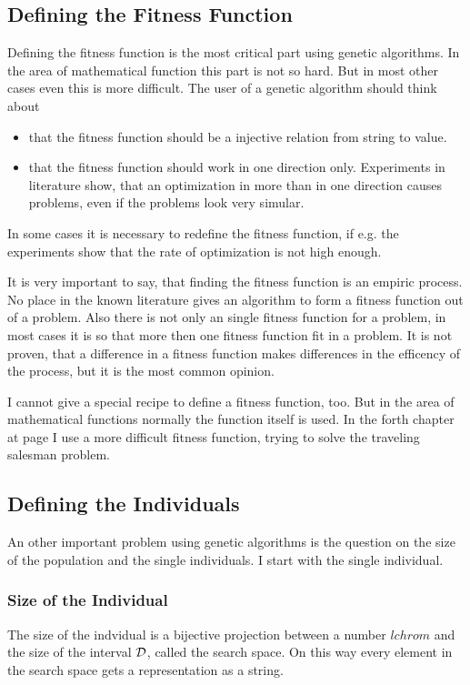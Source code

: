 \subsection{Defining the Fitness Function}
Defining the fitness function is the most critical part using genetic algorithms.
In the area of mathematical function this part is not so hard. But in most other
cases even this is more difficult.
The user of a genetic algorithm should think about
\begin{itemize}
  \item that the fitness function should be a injective relation from string
to value.
  \item that the fitness function should work in one direction only. Experiments
in literature\cite{Gol89} show, that an optimization in more than in one direction
causes problems, even if the problems look very simular.
\end{itemize}
In some cases it is necessary to redefine the fitness function, if e.g. the
experiments show that the rate of optimization is not high enough.

It is very important to say, that finding the fitness function is an empiric
process. No place in the known literature gives an algorithm to form a fitness
function out of a problem. Also there is not only an single fitness function
for a problem, in most cases it is so that more then one fitness function fit
in a problem. It is not proven, that a difference in a fitness function makes
differences in the efficency of the process, but it is the most common opinion.

I cannot give a special recipe to define a fitness function, too. But in the
area of mathematical functions normally the function itself is used. In the
forth chapter at page \pageref{chap4beg} I use a more difficult fitness function,
trying to solve the traveling salesman problem.
\subsection{Defining the Individuals}
An other important problem using genetic algorithms is the question on the size
of the population and the single individuals. I start with the single individual.
\subsubsection{Size of the Individual}
The size of the indvidual is a bijective projection between a number $lchrom$
and the size of the interval $\cal{D}$, called the search space. On this way
every element in the search space gets a representation as a string.

